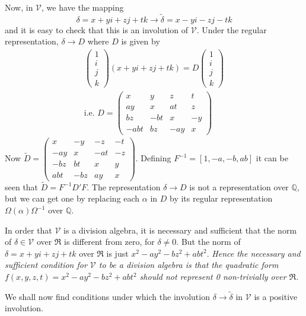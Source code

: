\begin{remark*}
Now, in $\mathscr{V}$, we have the mapping
$$
\delta = x + yi + zj + tk \rightarrow \widetilde{\delta} = x - yi - zj - tk
$$\pageoriginale
and it is easy to check that this is an involution of
$\mathscr{V}$. Under the regular representation, $\delta \rightarrow
D$ where $D$ is given by 
\begin{gather*}
\left(\begin{smallmatrix} 1\\ i\\ j \\k\end{smallmatrix}\right) (x+yi
  + zj + tk) = D
  \left(\begin{smallmatrix} 1 \\ i \\ j \\ k \end{smallmatrix}\right)
  \\
\text{i.e. } D =
\left(\begin{smallmatrix} x & y & z & t \\
ay & x & at & z\\
bz & -bt & x & -y \\
-abt & bz & -ay & x
\end{smallmatrix}\right) 
\end{gather*}
Now $\widetilde{D} = \left(\begin{smallmatrix} x & -y & -z & -t \\
-ay & x & -at & -z\\
-bz & bt & x & y \\
abt & -bz & ay & x
\end{smallmatrix}\right)$. Defining $F^{-1} = [1, -a, -b, ab]$ it can
be seen that $\widetilde{D} = F^{-1} D' F$. The representation $\delta
\rightarrow D$ is not a representation over $\mathbb{Q}$, but we can
get one by replacing each $\alpha$ in $D$ by its regular
representation $\Omega (\alpha) \Omega^{-1}$ over $\mathbb{Q}$.

In order that $\mathscr{V}$ is a division algebra, it is necessary and
sufficient that the norm of $\delta \in \mathscr{V}$ over
$\mathfrak{R}$ is different from zero, for $\delta \neq 0$. But the
norm of $\delta = x + yi + zj +tk$ over $\mathfrak{R}$ is just $x^2 -
ay^2 - bz^2 + abt^2$. {\em Hence the necessary and sufficient
  condition for $\mathscr{V}$ to be a division algebra is that the
  quadratic form $f(x,y,z,t) = x^2- ay^2- bz^2 + abt^2$ should not
  represent 0 non-trivially over $\mathfrak{R}$}.

We shall now find conditions under which the involution $\delta
\rightarrow \widetilde{\delta}$ in $\mathscr{V}$ is a positive
involution.


\end{remark*}
